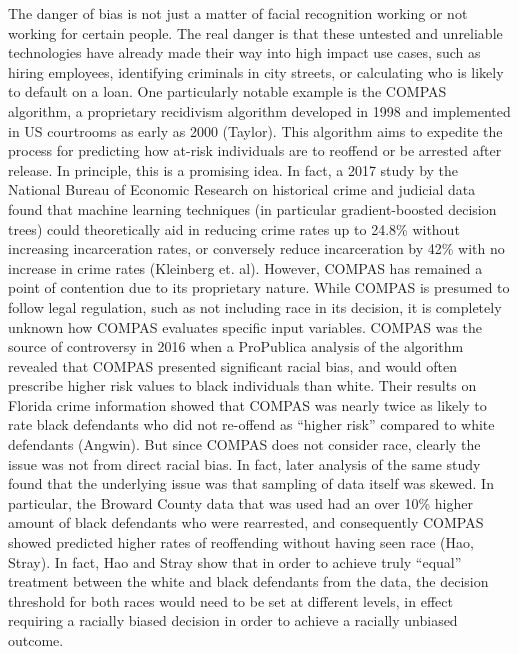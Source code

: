 \documentclass[10pt]{article}
\begin{document}
  The danger of bias is not just a matter of facial recognition working or not working for certain people. The real danger is that these untested and unreliable technologies have already made their way into high impact use cases, such as hiring employees, identifying criminals in city streets, or calculating who is likely to default on a loan. One particularly notable example is the COMPAS algorithm, a proprietary recidivism algorithm developed in 1998 and implemented in US courtrooms as early as 2000 (Taylor). This algorithm aims to expedite the process for predicting how at-risk individuals are to reoffend or be arrested after release. In principle, this is a promising idea. In fact, a 2017 study by the National Bureau of Economic Research on historical crime and judicial data found that machine learning techniques (in particular gradient-boosted decision trees) could theoretically aid in reducing crime rates up to 24.8\% without increasing incarceration rates, or conversely reduce incarceration by 42\% with no increase in crime rates (Kleinberg et. al). However, COMPAS has remained a point of contention due to its proprietary nature. While COMPAS is presumed to follow legal regulation, such as not including race in its decision, it is completely unknown how COMPAS evaluates specific input variables. COMPAS was the source of controversy in 2016 when a ProPublica analysis of the algorithm revealed that COMPAS presented significant racial bias, and would often prescribe higher risk values to black individuals than white. Their results on Florida crime information showed that COMPAS was nearly twice as likely to rate black defendants who did not re-offend as “higher risk” compared to white defendants (Angwin). But since COMPAS does not consider race, clearly the issue was not from direct racial bias. In fact, later analysis of the same study found that the underlying issue was that sampling of data itself was skewed. In particular, the Broward County data that was used had an over 10\% higher amount of black defendants who were rearrested, and consequently COMPAS showed predicted higher rates of reoffending without having seen race (Hao, Stray). In fact, Hao and Stray show that in order to achieve truly “equal” treatment between the white and black defendants from the data, the decision threshold for both races would need to be set at different levels, in effect requiring a racially biased decision in order to achieve a racially unbiased outcome.
\end{document}
